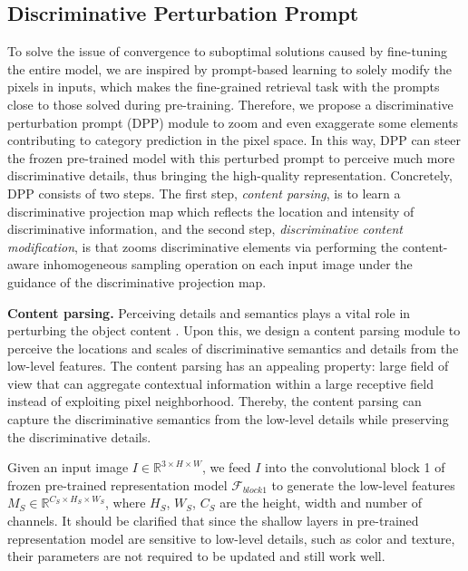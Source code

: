\documentclass[letterpaper]{article} %
\begin{document}
\subsection{Discriminative Perturbation Prompt}
To solve the issue of convergence to suboptimal solutions caused by fine-tuning the entire model, we are inspired by prompt-based learning to solely modify the pixels in inputs, which makes the fine-grained retrieval task with the prompts close to those solved during pre-training.
Therefore, we propose a discriminative perturbation prompt (DPP) module to zoom and even exaggerate some elements contributing to category prediction in the pixel space. In this way, DPP can steer the frozen pre-trained model with this perturbed prompt to perceive much more discriminative details, thus bringing the high-quality representation.
Concretely, DPP consists of two steps. The first step, \textit{content parsing}, is to learn a discriminative projection map which reflects the location and intensity of discriminative information, and the second step, \textit{discriminative content modification}, is that zooms discriminative elements via performing the content-aware inhomogeneous sampling operation on each input image under the guidance of the discriminative projection map.

\textbf{Content parsing.} Perceiving details and semantics plays a vital role in perturbing the object content \cite{DBLP:conf/mm/WangWLO20,DBLP:conf/aaai/WangLWO21, DBLP:conf/icmcs/WangWZLL19}. Upon this, we design a content parsing module to perceive the locations and scales of discriminative semantics and details from the low-level features. The content parsing has an appealing property: large field of view that can aggregate contextual information within a large receptive field instead of exploiting pixel neighborhood. Thereby, the content parsing can capture the discriminative semantics from the low-level details while preserving the discriminative details.


Given an input image $ I \in \mathbb{R}^{3\times H \times W} $, we  feed $ I $ into the convolutional block 1 of frozen pre-trained representation model $ \mathcal{F}_{block1} $ to generate the low-level features $ M_S \in\mathbb{R}^{C_S \times H_S \times W_S} $, where $ H_S $, $W_S $, $ C_S $ are the height, width and number of channels. It should be clarified that since the shallow layers in pre-trained representation model are sensitive to low-level details, such as color and texture, their parameters are not required to be updated and still work well.
\end{document}
